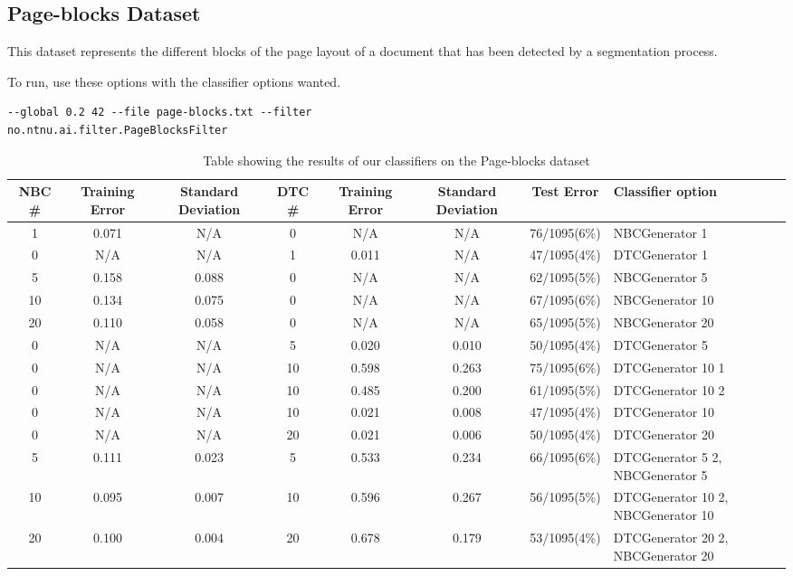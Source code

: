 \subsection{Page-blocks Dataset}\label{pblocks}
This dataset represents the different blocks of the page layout of a document 
that has been detected by a segmentation process.

To run, use these options with the classifier options wanted.

\begin{lstlisting}[label=lst:pblocks, caption=Page-blocks dataset general 
options]
--global 0.2 42 --file page-blocks.txt --filter 
no.ntnu.ai.filter.PageBlocksFilter
\end{lstlisting}

\begin{landscape}
\begin{table}
\begin{tabular}{|c|c|c||c|c|c||c||p{5cm}|}
\hline
NBC \# & Training Error & Standard Deviation & DTC \# & Training Error
& Standard Deviation & Test Error & Classifier option \\ \hline
1 & 0.071 & N/A & 0 & N/A & N/A & 76/1095(6\%) & NBCGenerator 1 \\ \hline
0 & N/A & N/A & 1 & 0.011 & N/A & 47/1095(4\%) & DTCGenerator 1 \\ \hline
5 & 0.158 & 0.088 & 0 & N/A & N/A & 62/1095(5\%) & NBCGenerator 5 \\ \hline
10 & 0.134 & 0.075 & 0 & N/A & N/A & 67/1095(6\%) & NBCGenerator 10 \\ \hline
20 & 0.110 & 0.058 & 0 & N/A & N/A & 65/1095(5\%) & NBCGenerator 20 \\ \hline
0 & N/A & N/A & 5 & 0.020 & 0.010 & 50/1095(4\%) & DTCGenerator 5 \\ \hline
0 & N/A & N/A & 10 & 0.598 & 0.263 & 75/1095(6\%) & DTCGenerator 10 1 \\ \hline
0 & N/A & N/A & 10 & 0.485 & 0.200 & 61/1095(5\%) & DTCGenerator 10 2 \\ \hline
0 & N/A & N/A & 10 & 0.021 & 0.008 & 47/1095(4\%) & DTCGenerator 10 \\ \hline
0 & N/A & N/A & 20 & 0.021 & 0.006 & 50/1095(4\%) & DTCGenerator 20 \\ \hline
5 & 0.111 & 0.023 & 5 & 0.533 & 0.234 & 66/1095(6\%) & DTCGenerator 5 2, 
\newline NBCGenerator 5 \\ \hline
10 & 0.095 & 0.007 & 10 & 0.596 & 0.267 & 56/1095(5\%) & DTCGenerator 10 2, 
\newline NBCGenerator 10 \\ \hline
20 & 0.100 & 0.004 & 20 & 0.678 & 0.179 & 53/1095(4\%) & DTCGenerator 20 2, 
\newline NBCGenerator 20 \\ \hline
\hline
\end{tabular}
\label{tab:pblocks}
\caption[Page-blocks dataset boosting]{Table showing the results of our 
classifiers on the Page-blocks 
dataset}
\end{table}
\end{landscape}
